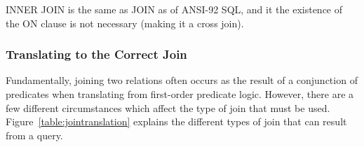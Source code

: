 \documentclass[a4paper, 11pt]{article}
\begin{document}
      INNER JOIN is the same as JOIN as of ANSI-92 SQL, and it the existence of
      the ON clause is not necessary (making it a cross join).

    \subsubsection{Translating to the Correct Join}

      Fundamentally, joining two relations often occurs as the result of a
      conjunction of predicates when translating from first-order predicate
      logic. However, there are a few different circumstances which affect the
      type of join that must be used. Figure~\ref{table:jointranslation} explains
      the different types of join that can result from a query.

      \newcommand*{\tabbox}[2][t]{%
            \centering\vspace{0pt}\parbox[#1][3.7\baselineskip]{6.5cm}{\strut#2\strut}}
\end{document}
